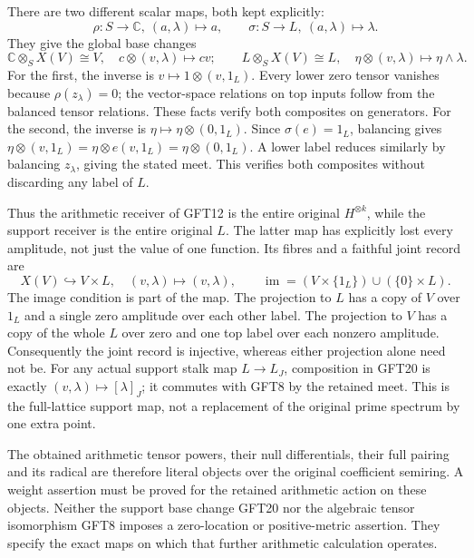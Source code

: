 There are two different scalar maps, both kept explicitly:
\begin{equation}\tag{GFT19}
 \rho:S\to\mathbb C,\ (a,\lambda)\mapsto a,
 \qquad \sigma:S\to L,\ (a,\lambda)\mapsto\lambda.
\end{equation}
They give the global base changes
\begin{equation}\tag{GFT20}
 \mathbb C\otimes_S X(V)\cong V,\quad
     c\otimes(v,\lambda)\mapsto cv;\qquad
 L\otimes_S X(V)\cong L,\quad
     \eta\otimes(v,\lambda)\mapsto\eta\wedge\lambda.
\end{equation}
For the first, the inverse is $v\mapsto1\otimes(v,1_L)$.
Every lower zero tensor vanishes because $\rho(z_\lambda)=0$;
the vector-space relations on top inputs follow from the
balanced tensor relations. These facts verify both composites
on generators. For the second, the inverse is
$\eta\mapsto\eta\otimes(0,1_L)$. Since $\sigma(e)=1_L$,
balancing gives
$\eta\otimes(v,1_L)=\eta\otimes e(v,1_L)
=\eta\otimes(0,1_L)$. A lower label reduces similarly by
balancing $z_\lambda$, giving the stated meet. This verifies
both composites without discarding any label of $L$.

Thus the arithmetic receiver of GFT12 is the entire original
$H^{\otimes k}$, while the support receiver is the entire
original $L$. The latter map has explicitly lost every amplitude,
not just the value of one function. Its fibres and a faithful
joint record are
\begin{equation}\tag{GFT21}
 X(V)\hookrightarrow V\times L,\quad(v,\lambda)\mapsto(v,\lambda),
 \qquad\operatorname{im}=
       (V\times\{1_L\})\cup(\{0\}\times L).
\end{equation}
The image condition is part of the map. The projection to $L$
has a copy of $V$ over $1_L$ and a single zero amplitude over
each other label. The projection to $V$ has a copy of the whole
$L$ over zero and one top label over each nonzero amplitude.
Consequently the joint record is injective, whereas either
projection alone need not be. For any actual support stalk map
$L\to L_J$, composition in GFT20 is exactly
$(v,\lambda)\mapsto[\lambda]_J$; it commutes with GFT8 by the
retained meet. This is the full-lattice support map, not a
replacement of the original prime spectrum by one extra point.

The obtained arithmetic tensor powers, their null differentials,
their full pairing and its radical are therefore literal objects
over the original coefficient semiring. A weight assertion must
be proved for the retained arithmetic action on these objects.
Neither the support base change GFT20 nor the algebraic tensor
isomorphism GFT8 imposes a zero-location or positive-metric
assertion. They specify the exact maps on which that further
arithmetic calculation operates.

